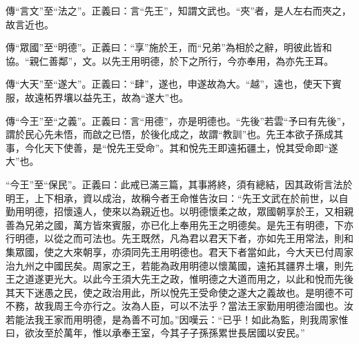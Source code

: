 {\noindent\zhuan{}\fzbyks 傳“言文”至“法之”。正義曰：言“先王”，知謂文武也。“夾”者，是人左右而夾之，故言近也。 \par}

{\noindent\zhuan{}\fzbyks 傳“眾國”至“明德”。正義曰：“享”施於王，而“兄弟”為相於之辭，明彼此皆和協。“親仁善鄰”，文。以先王用明德，於下之所行，今亦奉用，為亦先王耳。 \par}

{\noindent\zhuan{}\fzbyks 傳“大天”至“遂大”。正義曰：“肆”，遂也，申遂故為大。“越”，遠也，使天下賓服，故遠柘界壤以益先王，故為“遂大”也。 \par}

{\noindent\zhuan{}\fzbyks 傳“今王”至“之義”。正義曰：言“用德”，亦是明德也。“先後”若雲“予曰有先後”，謂於民心先未悟，而啟之已悟，於後化成之，故謂“教訓”也。先王本欲子孫成其事，今化天下使善，是“悅先王受命”。其和悅先王即遠拓疆土，悅其受命即“遂大”也。 \par}

{\noindent\shu{}\fzkt “今王”至“保民”。正義曰：此戒已滿三篇，其事將終，須有總結，因其政術言法於明王，上下相承，資以成治，故稱今者王命惟告汝曰：“先王文武在於前世，以自勤用明德，招懷遠人，使來以為親近也。以明德懷柔之故，眾國朝享於王，又相親善為兄弟之國，萬方皆來賓服，亦已化上奉用先王之明德矣。是先王有明德，下亦行明德，以從之而可法也。先王既然，凡為君以君天下者，亦如先王用常法，則和集眾國，使之大來朝享，亦須同先王用明德也。君天下者當如此，今大天已付周家治九州之中國民矣。周家之王，若能為政用明德以懷萬國，遠拓其疆界土壤，則先王之道遂更光大。以此今王須大先王之政，惟明德之大道而用之，以此和悅而先後其天下迷愚之民，使之政治用此，所以悅先王受命使之遂大之義故也。是明德不可不務，故我周王今亦行之。汝為人臣，可以不法乎？當法王家勤用明德治國也。汝若能法我王家而用明德，是為善不可加。”因嘆云：“已乎！如此為監，則我周家惟曰，欲汝至於萬年，惟以承奉王室，今其子子孫孫累世長居國以安民。” \par}


